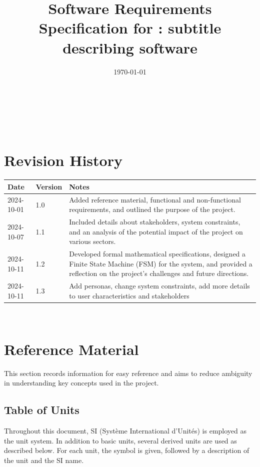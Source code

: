 \documentclass[12pt]{article}
\begin{document}
\title{Software Requirements Specification for \progname: subtitle describing software} 
\author{\authname}
\date{\today}
	
\maketitle

~\newpage
{}
\tableofcontents

~\newpage

\section*{Revision History}

\begin{tabularx}{\textwidth}{p{3cm}p{2cm}X}
  \toprule
  {\bf Date} & {\bf Version} & {\bf Notes}\\
  \midrule
  2024-10-01 & 1.0 & Added reference material, functional and non-functional requirements, and outlined the purpose of the project.\\
  2024-10-07 & 1.1 & Included details about stakeholders, system constraints, and an analysis of the potential impact of the project on various sectors.\\
  2024-10-11 & 1.2 & Developed formal mathematical specifications, designed a Finite State Machine (FSM) for the system, and provided a reflection on the project's challenges and future directions.\\
  2024-10-11 & 1.3 & Add personas, change system constraints, add more details to user characteristics and stakeholders\\
  \bottomrule
  \end{tabularx}


~\newpage

\section{Reference Material}

This section records information for easy reference and aims to reduce ambiguity in understanding key concepts used in the project.

\subsection{Table of Units}

Throughout this document, SI (Système International d'Unités) is employed as the unit system. In addition to basic units, several derived units are used as described below. For each unit, the symbol is given, followed by a description of the unit and the SI name.
\end{document}
